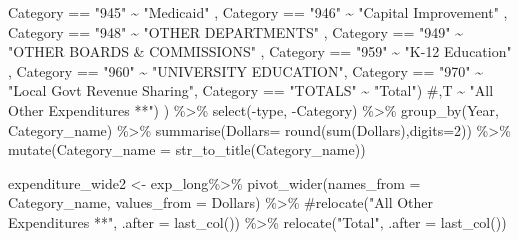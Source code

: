 \documentclass[
  letterpaper,
  DIV=11,
  numbers=noendperiod]{scrreport}
\newenvironment{Shaded}{\begin{snugshade}}{\end{snugshade}}
\newcommand{\AttributeTok}[1]{\textcolor[rgb]{0.40,0.45,0.13}{#1}}
\newcommand{\CommentTok}[1]{\textcolor[rgb]{0.37,0.37,0.37}{#1}}
\newcommand{\DecValTok}[1]{\textcolor[rgb]{0.68,0.00,0.00}{#1}}
\newcommand{\FunctionTok}[1]{\textcolor[rgb]{0.28,0.35,0.67}{#1}}
\newcommand{\NormalTok}[1]{\textcolor[rgb]{0.00,0.23,0.31}{#1}}
\newcommand{\OtherTok}[1]{\textcolor[rgb]{0.00,0.23,0.31}{#1}}
\newcommand{\SpecialCharTok}[1]{\textcolor[rgb]{0.37,0.37,0.37}{#1}}
\newcommand{\StringTok}[1]{\textcolor[rgb]{0.13,0.47,0.30}{#1}}
\begin{document}
\begin{Shaded}
\begin{Highlighting}[]
\NormalTok{             Category }\SpecialCharTok{==} \StringTok{"945"} \SpecialCharTok{\textasciitilde{}} \StringTok{"Medicaid"}\NormalTok{ ,}
\NormalTok{             Category }\SpecialCharTok{==} \StringTok{"946"} \SpecialCharTok{\textasciitilde{}} \StringTok{"Capital Improvement"}\NormalTok{ , }
\NormalTok{             Category }\SpecialCharTok{==} \StringTok{"948"} \SpecialCharTok{\textasciitilde{}} \StringTok{"OTHER DEPARTMENTS"}\NormalTok{ ,}
\NormalTok{             Category }\SpecialCharTok{==} \StringTok{"949"} \SpecialCharTok{\textasciitilde{}} \StringTok{"OTHER BOARDS \& COMMISSIONS"}\NormalTok{ ,}
\NormalTok{             Category }\SpecialCharTok{==} \StringTok{"959"} \SpecialCharTok{\textasciitilde{}} \StringTok{"K{-}12 Education"}\NormalTok{ ,}
\NormalTok{             Category }\SpecialCharTok{==} \StringTok{"960"} \SpecialCharTok{\textasciitilde{}} \StringTok{"UNIVERSITY EDUCATION"}\NormalTok{,}
\NormalTok{             Category }\SpecialCharTok{==} \StringTok{"970"} \SpecialCharTok{\textasciitilde{}} \StringTok{"Local Govt Revenue Sharing"}\NormalTok{,}
\NormalTok{          Category }\SpecialCharTok{==} \StringTok{"TOTALS"} \SpecialCharTok{\textasciitilde{}} \StringTok{"Total"}\NormalTok{) }\CommentTok{\#,T \textasciitilde{} "All Other Expenditures **")}
\NormalTok{           ) }\SpecialCharTok{\%\textgreater{}\%} 
  \FunctionTok{select}\NormalTok{(}\SpecialCharTok{{-}}\NormalTok{type, }\SpecialCharTok{{-}}\NormalTok{Category) }\SpecialCharTok{\%\textgreater{}\%} 
  \FunctionTok{group\_by}\NormalTok{(Year, Category\_name) }\SpecialCharTok{\%\textgreater{}\%} 
  \FunctionTok{summarise}\NormalTok{(}\AttributeTok{Dollars=} \FunctionTok{round}\NormalTok{(}\FunctionTok{sum}\NormalTok{(Dollars),}\AttributeTok{digits=}\DecValTok{2}\NormalTok{)) }\SpecialCharTok{\%\textgreater{}\%} 
  \FunctionTok{mutate}\NormalTok{(}\AttributeTok{Category\_name =} \FunctionTok{str\_to\_title}\NormalTok{(Category\_name))}

\NormalTok{expenditure\_wide2 }\OtherTok{\textless{}{-}}\NormalTok{ exp\_long}\SpecialCharTok{\%\textgreater{}\%} 
  \FunctionTok{pivot\_wider}\NormalTok{(}\AttributeTok{names\_from =}\NormalTok{ Category\_name, }
              \AttributeTok{values\_from =}\NormalTok{ Dollars) }\SpecialCharTok{\%\textgreater{}\%}
  \CommentTok{\#relocate("All Other Expenditures **", .after = last\_col()) \%\textgreater{}\%}
  \FunctionTok{relocate}\NormalTok{(}\StringTok{"Total"}\NormalTok{, }\AttributeTok{.after =}  \FunctionTok{last\_col}\NormalTok{())}



\end{Highlighting}
\end{Shaded}
\end{document}
